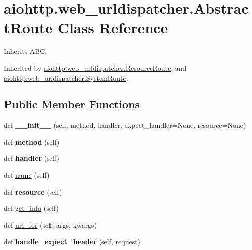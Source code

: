\hypertarget{classaiohttp_1_1web__urldispatcher_1_1_abstract_route}{}\section{aiohttp.\+web\+\_\+urldispatcher.\+Abstract\+Route Class Reference}
\label{classaiohttp_1_1web__urldispatcher_1_1_abstract_route}


Inherits A\+BC.



Inherited by \hyperlink{classaiohttp_1_1web__urldispatcher_1_1_resource_route}{aiohttp.\+web\+\_\+urldispatcher.\+Resource\+Route}, and \hyperlink{classaiohttp_1_1web__urldispatcher_1_1_system_route}{aiohttp.\+web\+\_\+urldispatcher.\+System\+Route}.

\subsection*{Public Member Functions}
\begin{DoxyCompactItemize}
\item 
\mbox{\label{classaiohttp_1_1web__urldispatcher_1_1_abstract_route_a2de869bcb4e5eff92aa7221895ecd79a}} 
def {\bfseries \+\_\+\+\_\+init\+\_\+\+\_\+} (self, method, handler, expect\+\_\+handler=None, resource=None)
\item 
\mbox{\label{classaiohttp_1_1web__urldispatcher_1_1_abstract_route_aa43ca8053bdb67848f766ed5292404d8}} 
def {\bfseries method} (self)
\item 
\mbox{\label{classaiohttp_1_1web__urldispatcher_1_1_abstract_route_ac16024d102e0aa7929b578ee9583be2e}} 
def {\bfseries handler} (self)
\item 
def \hyperlink{classaiohttp_1_1web__urldispatcher_1_1_abstract_route_a32a0a7af736bef40ea54b2ad205e4f72}{name} (self)
\item 
\mbox{\label{classaiohttp_1_1web__urldispatcher_1_1_abstract_route_a2207e455acdcb2475d72786c03159991}} 
def {\bfseries resource} (self)
\item 
def \hyperlink{classaiohttp_1_1web__urldispatcher_1_1_abstract_route_a2a4b0b79cc0c386299b17c58f1a4dc6a}{get\+\_\+info} (self)
\item 
def \hyperlink{classaiohttp_1_1web__urldispatcher_1_1_abstract_route_a920185789e484154c92124b214cdf3fc}{url\+\_\+for} (self, args, kwargs)
\item 
\mbox{\label{classaiohttp_1_1web__urldispatcher_1_1_abstract_route_a7d81467f662c0d74939c8f0b2be44c90}} 
def {\bfseries handle\+\_\+expect\+\_\+header} (self, request)
\end{DoxyCompactItemize}


